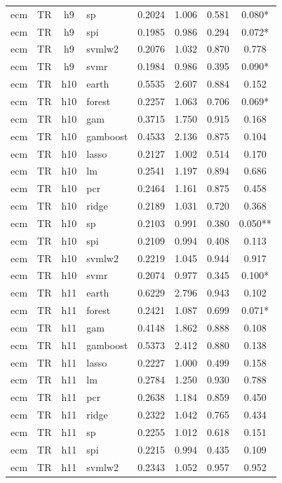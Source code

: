 \begin{ThreePartTable}
\begin{longtable}[t]{llclcccc}
ecm & TR & h9 & sp & 0.2024 & 1.006 & 0.581 & 0.080*\\
ecm & TR & h9 & spi & 0.1985 & 0.986 & 0.294 & 0.072*\\
ecm & TR & h9 & svmlw2 & 0.2076 & 1.032 & 0.870 & 0.778\\
ecm & TR & h9 & svmr & 0.1984 & 0.986 & 0.395 & 0.090*\\
\addlinespace
ecm & TR & h10 & earth & 0.5535 & 2.607 & 0.884 & 0.152\\
ecm & TR & h10 & forest & 0.2257 & 1.063 & 0.706 & 0.069*\\
ecm & TR & h10 & gam & 0.3715 & 1.750 & 0.915 & 0.168\\
ecm & TR & h10 & gamboost & 0.4533 & 2.136 & 0.875 & 0.104\\
ecm & TR & h10 & lasso & 0.2127 & 1.002 & 0.514 & 0.170\\
ecm & TR & h10 & lm & 0.2541 & 1.197 & 0.894 & 0.686\\
ecm & TR & h10 & pcr & 0.2464 & 1.161 & 0.875 & 0.458\\
ecm & TR & h10 & ridge & 0.2189 & 1.031 & 0.720 & 0.368\\
ecm & TR & h10 & sp & 0.2103 & 0.991 & 0.380 & 0.050**\\
ecm & TR & h10 & spi & 0.2109 & 0.994 & 0.408 & 0.113\\
ecm & TR & h10 & svmlw2 & 0.2219 & 1.045 & 0.944 & 0.917\\
ecm & TR & h10 & svmr & 0.2074 & 0.977 & 0.345 & 0.100*\\
\addlinespace
ecm & TR & h11 & earth & 0.6229 & 2.796 & 0.943 & 0.102\\
ecm & TR & h11 & forest & 0.2421 & 1.087 & 0.699 & 0.071*\\
ecm & TR & h11 & gam & 0.4148 & 1.862 & 0.888 & 0.108\\
ecm & TR & h11 & gamboost & 0.5373 & 2.412 & 0.880 & 0.138\\
ecm & TR & h11 & lasso & 0.2227 & 1.000 & 0.499 & 0.158\\
ecm & TR & h11 & lm & 0.2784 & 1.250 & 0.930 & 0.788\\
ecm & TR & h11 & pcr & 0.2638 & 1.184 & 0.859 & 0.450\\
ecm & TR & h11 & ridge & 0.2322 & 1.042 & 0.765 & 0.434\\
ecm & TR & h11 & sp & 0.2255 & 1.012 & 0.618 & 0.151\\
ecm & TR & h11 & spi & 0.2215 & 0.994 & 0.435 & 0.109\\
ecm & TR & h11 & svmlw2 & 0.2343 & 1.052 & 0.957 & 0.952\\

\end{longtable}
\end{ThreePartTable}
